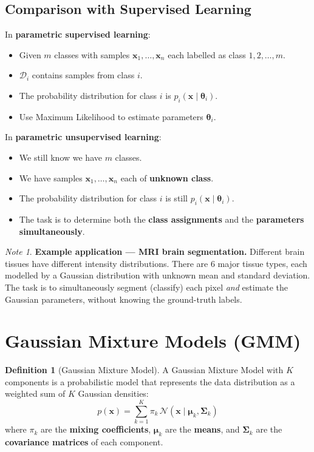 \documentclass[11pt,a4paper]{article}
\theoremstyle{definition}
\newtheorem{definition}{Definition}[section]
\theoremstyle{plain}
\theoremstyle{remark}
\newtheorem*{remark}{Note}
\begin{document}
\subsection{Comparison with Supervised Learning}

In \textbf{parametric supervised learning}:
\begin{itemize}
    \item Given $m$ classes with samples $\mathbf{x}_1, \dots, \mathbf{x}_n$ each labelled as class $1, 2, \dots, m$.
    \item $\mathcal{D}_i$ contains samples from class $i$.
    \item The probability distribution for class $i$ is $p_i(\mathbf{x} \mid \boldsymbol{\theta}_i)$.
    \item Use Maximum Likelihood to estimate parameters $\boldsymbol{\theta}_i$.
\end{itemize}

In \textbf{parametric unsupervised learning}:
\begin{itemize}
    \item We still know we have $m$ classes.
    \item We have samples $\mathbf{x}_1, \dots, \mathbf{x}_n$ each of \textbf{unknown class}.
    \item The probability distribution for class $i$ is still $p_i(\mathbf{x} \mid \boldsymbol{\theta}_i)$.
    \item The task is to determine both the \textbf{class assignments} and the \textbf{parameters simultaneously}.
\end{itemize}

\begin{remark}
\textbf{Example application --- MRI brain segmentation.} Different brain tissues have different intensity distributions. There are 6 major tissue types, each modelled by a Gaussian distribution with unknown mean and standard deviation. The task is to simultaneously segment (classify) each pixel \emph{and} estimate the Gaussian parameters, without knowing the ground-truth labels.
\end{remark}

\section{Gaussian Mixture Models (GMM)}

\begin{definition}[Gaussian Mixture Model]
A Gaussian Mixture Model with $K$ components is a probabilistic model that represents the data distribution as a weighted sum of $K$ Gaussian densities:
\[
p(\mathbf{x}) = \sum_{k=1}^{K} \pi_k \, \mathcal{N}(\mathbf{x} \mid \boldsymbol{\mu}_k, \boldsymbol{\Sigma}_k)
\]
where $\pi_k$ are the \textbf{mixing coefficients}, $\boldsymbol{\mu}_k$ are the \textbf{means}, and $\boldsymbol{\Sigma}_k$ are the \textbf{covariance matrices} of each component.
\end{definition}
\end{document}
